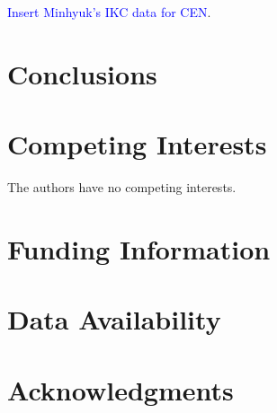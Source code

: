 \documentclass[12pt, oneside]{article}   	%
\begin{document}
\textcolor{blue}{Insert Minhyuk's IKC data for CEN}.


		
\section{Conclusions}
	
\section*{Competing Interests} \vspace{3mm} The authors have no competing interests. 
	
\section*{Funding Information} 
	
\section*{Data Availability} 
	
\section*{Acknowledgments} 



\end{document}
